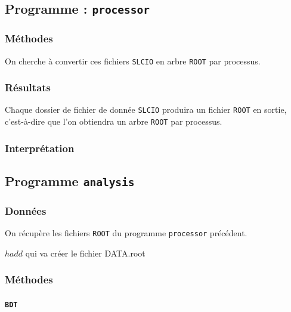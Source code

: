 \documentclass[10pt,a4paper]{report}
\newcommand{\cad}{c'est-à-dire\xspace}
\newcommand{\ROOT}{\texttt{ROOT}\xspace}
\newcommand{\SLCIO}{\texttt{SLCIO}\xspace}
\newcommand{\processor}{\texttt{processor}\xspace}
\newcommand{\analysis}{\texttt{analysis}\xspace}
\begin{document}

\subsection{Programme : \processor}

\subsubsection{Méthodes}

On cherche à convertir ces fichiers \SLCIO en arbre \ROOT par processus.

\subsubsection{Résultats}

Chaque dossier de fichier de donnée \SLCIO produira un fichier \ROOT en sortie, \cad que l'on obtiendra un arbre \ROOT par processus.


\subsubsection{Interprétation}

\subsection{Programme \analysis}

\subsubsection{Données}

On récupère les fichiers \ROOT du programme \processor précédent. 

$ hadd $ qui va créer le fichier DATA.root

\subsubsection{Méthodes}

\paragraph{\texttt{BDT}}
\end{document}
